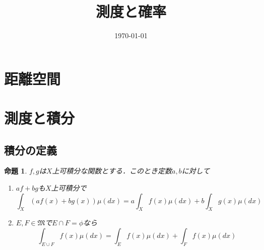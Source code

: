 \documentclass[a4paper,11pt]{jsarticle}
\title{測度と確率}
\author{\empty}
\date{\today}
\newtheorem{prop}[definition]{命題}
\begin{document}
%
\section{距離空間}
%
%
%
%
\section{測度と積分}
\subsection{積分の定義}
\setcounter{definition}{13}
\begin{prop}
$f,g$は$X$上可積分な関数とする．このとき定数$a,b$に対して
\begin{enumerate}
\renewcommand{\labelenumi}{(\roman{enumi})}
\item $af+bg$も$X$上可積分で
\begin{equation*}
\int_X(af(x)+bg(x))\mu(dx)=a\int_Xf(x)\mu(dx)+b\int_Xg(x)\mu(dx)
\end{equation*}
\item $E,F\in\mathfrak{M}$で$E\cap F=\phi$なら
\begin{equation*}
\int_{E\cup F}f(x)\mu(dx)=\int_Ef(x)\mu(dx)+\int_Ff(x)\mu(dx)
\end{equation*}
\end{enumerate}
\end{prop}
\end{document}
